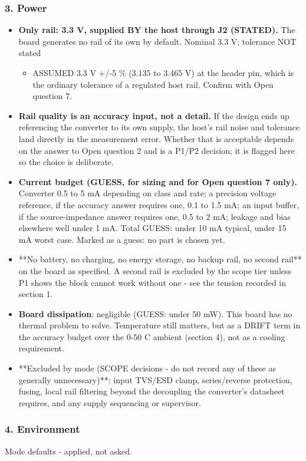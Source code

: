 \documentclass[11pt,a4paper]{article}
\begin{document}
\subsubsection*{3. Power}
\begin{itemize}
\item \textbf{Only rail: 3.3 V, supplied BY the host through J2 (STATED).} The board
generates no rail of its own by default. Nominal 3.3 V; tolerance NOT stated
\begin{itemize}
\item ASSUMED 3.3 V +/-5 \% (3.135 to 3.465 V) at the header pin, which is the
ordinary tolerance of a regulated host rail. Confirm with Open question 7.
\end{itemize}
\item \textbf{Rail quality is an accuracy input, not a detail.} If the design ends up
referencing the converter to its own supply, the host's rail noise and
tolerance land directly in the measurement error. Whether that is acceptable
depends on the answer to Open question 2 and is a P1/P2 decision; it is
flagged here so the choice is deliberate.
\item \textbf{Current budget (GUESS, for sizing and for Open question 7 only).}
Converter 0.5 to 5 mA depending on class and rate; a precision voltage
reference, if the accuracy answer requires one, 0.1 to 1.5 mA; an input
buffer, if the source-impedance answer requires one, 0.5 to 2 mA; leakage
and bias elsewhere well under 1 mA. Total GUESS: under 10 mA typical, under
15 mA worst case. Marked as a guess: no part is chosen yet.
\item {*}{*}No battery, no charging, no energy storage, no backup rail, no second
rail{*}{*} on the board as specified. A second rail is excluded by the scope
tier unless P1 shows the block cannot work without one - see the tension
recorded in section 1.
\item \textbf{Board dissipation}: negligible (GUESS: under 50 mW). This board has no
thermal problem to solve. Temperature still matters, but as a DRIFT term in
the accuracy budget over the 0-50 C ambient (section 4), not as a cooling
requirement.
\item {*}{*}Excluded by mode (SCOPE decisions - do not record any of these as
generally unnecessary){*}{*}: input TVS/ESD clamp, series/reverse protection,
fusing, local rail filtering beyond the decoupling the converter's datasheet
requires, and any supply sequencing or supervisor.
\end{itemize}
\subsubsection*{4. Environment}
Mode defaults - applied, not asked.
\end{document}
